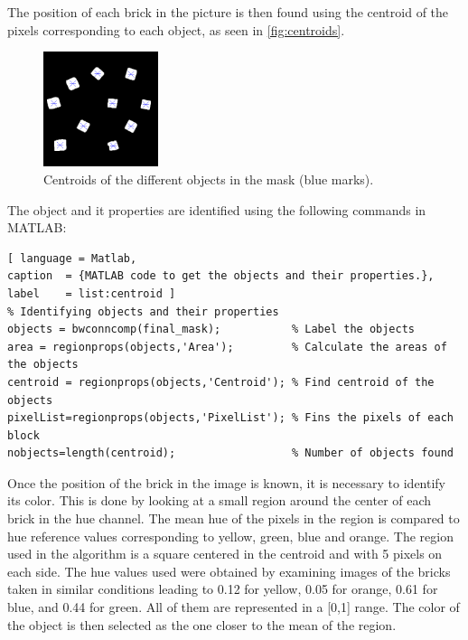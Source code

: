 The position of each brick in the picture is then found using the centroid of the pixels corresponding to each object, as seen in \autoref{fig:centroids}.
%
\begin{figure}[H]
	\includegraphics[width=0.3\textwidth]{figures/centroids.png}
	\caption{Centroids of the different objects in the mask (blue marks).}
	\label{fig:centroids}
\end{figure}

The object and it properties are identified using the following commands in MATLAB:
%
\begin{lstlisting}[ language = Matlab,
caption  = {MATLAB code to get the objects and their properties.},
label    = list:centroid ]
% Identifying objects and their properties
objects = bwconncomp(final_mask);           % Label the objects
area = regionprops(objects,'Area');         % Calculate the areas of the objects
centroid = regionprops(objects,'Centroid'); % Find centroid of the objects
pixelList=regionprops(objects,'PixelList'); % Fins the pixels of each block
nobjects=length(centroid);                  % Number of objects found
\end{lstlisting}

Once the position of the brick in the image is known, it is necessary to identify its color. This is done by looking at a small region around the center of each brick in the hue channel. The mean hue of the pixels in the region is compared to hue reference values corresponding to yellow, green, blue and orange. The region used in the algorithm is a square centered in the centroid and with 5 pixels on each side. The hue values used were obtained by examining images of the bricks taken in similar conditions leading to 0.12 for yellow, 0.05 for orange, 0.61 for blue, and 0.44 for green. All of them are represented in a [0,1] range. The color of the object is then selected as the one closer to the mean of the region. 


